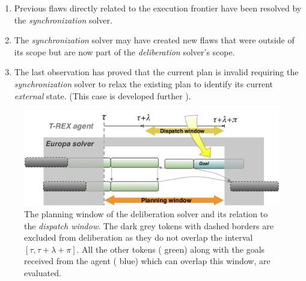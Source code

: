 \begin{enumerate}

\item Previous flaws directly related to the execution frontier have
  been resolved by the {\em synchronization} solver.

\item The {\em synchronization} solver may have created new flaws that
  were outside of its scope but are now part of the {\em deliberation}
  solver's scope.

\item The last observation has proved that the current plan is invalid
  requiring the {\em synchronization} solver to relax the existing
  plan to identify its current {\em external} state. (This case is
  developed further ).

\end{enumerate}

\begin{figure}[!htbp]
  \centering
  \includegraphics[width=0.65\columnwidth]{figs/plan_window.jpeg}
  \caption{\small The planning window of the deliberation solver and
    its relation to the {\em dispatch window}. The dark grey tokens
    with dashed borders are excluded from deliberation as they do not
    overlap the interval $[\tau, \tau+\lambda+\pi]$. All the other
    tokens ({\color{green} green}) along with the goals received from
    the agent ({\color{blue} blue}) which can overlap this window, are
    evaluated.}
  \label{fig:plan:window}
\end{figure}

